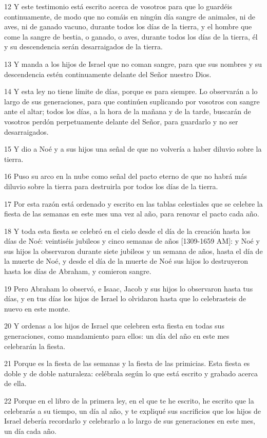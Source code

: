 \par 12 Y este testimonio está escrito acerca de vosotros para que lo guardéis continuamente, de modo que no comáis en ningún día sangre de animales, ni de aves, ni de ganado vacuno, durante todos los días de la tierra, y el hombre que come la sangre de bestia, o ganado, o aves, durante todos los días de la tierra, él y su descendencia serán desarraigados de la tierra.
\par 13 Y manda a los hijos de Israel que no coman sangre, para que sus nombres y su descendencia estén continuamente delante del Señor nuestro Dios.
\par 14 Y esta ley no tiene límite de días, porque es para siempre. Lo observarán a lo largo de sus generaciones, para que continúen suplicando por vosotros con sangre ante el altar; todos los días, a la hora de la mañana y de la tarde, buscarán de vosotros perdón perpetuamente delante del Señor, para guardarlo y no ser desarraigados.
\par 15 Y dio a Noé y a sus hijos una señal de que no volvería a haber diluvio sobre la tierra.
\par 16 Puso su arco en la nube como señal del pacto eterno de que no habrá más diluvio sobre la tierra para destruirla por todos los días de la tierra.
\par 17 Por esta razón está ordenado y escrito en las tablas celestiales que se celebre la fiesta de las semanas en este mes una vez al año, para renovar el pacto cada año.
\par 18 Y toda esta fiesta se celebró en el cielo desde el día de la creación hasta los días de Noé: veintiséis jubileos y cinco semanas de años [1309-1659 AM]: y Noé y sus hijos la observaron durante siete jubileos y un semana de años, hasta el día de la muerte de Noé, y desde el día de la muerte de Noé sus hijos lo destruyeron hasta los días de Abraham, y comieron sangre.
\par 19 Pero Abraham lo observó, e Isaac, Jacob y sus hijos lo observaron hasta tus días, y en tus días los hijos de Israel lo olvidaron hasta que lo celebrasteis de nuevo en este monte.
\par 20 Y ordenas a los hijos de Israel que celebren esta fiesta en todas sus generaciones, como mandamiento para ellos: un día del año en este mes celebrarán la fiesta.
\par 21 Porque es la fiesta de las semanas y la fiesta de las primicias. Esta fiesta es doble y de doble naturaleza: celébrala según lo que está escrito y grabado acerca de ella.
\par 22 Porque en el libro de la primera ley, en el que te he escrito, he escrito que la celebrarás a su tiempo, un día al año, y te expliqué sus sacrificios que los hijos de Israel debería recordarlo y celebrarlo a lo largo de sus generaciones en este mes, un día cada año.
